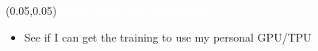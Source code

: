 \documentclass[aspectratio=169]{beamer} %
\begin{document}
\begin{frame}{}
    \setlength{\TPHorizModule}{\textwidth}
    \setlength{\TPVertModule}{\textwidth}
    \begin{textblock}{0.74}(0.05,0.05)
        \bfseries\large\textcolor{white}{Next Steps for this Project}
    \end{textblock}
    \begin{itemize}
        \item See if I can get the training to use my personal GPU/TPU
    \end{itemize}
\end{frame}
\end{document}

